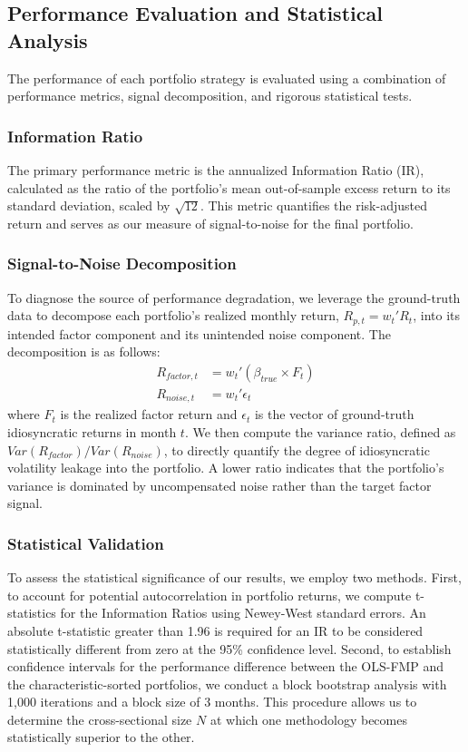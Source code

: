 \documentclass[]{article}
\begin{document}
\subsection{Performance Evaluation and Statistical Analysis}
The performance of each portfolio strategy is evaluated using a combination of performance metrics, signal decomposition, and rigorous statistical tests.

\subsubsection{Information Ratio}
The primary performance metric is the annualized Information Ratio (IR), calculated as the ratio of the portfolio's mean out-of-sample excess return to its standard deviation, scaled by $\sqrt{12}$. This metric quantifies the risk-adjusted return and serves as our measure of signal-to-noise for the final portfolio.

\subsubsection{Signal-to-Noise Decomposition}
To diagnose the source of performance degradation, we leverage the ground-truth data to decompose each portfolio's realized monthly return, $R_{p,t} = w_t' R_t$, into its intended factor component and its unintended noise component. The decomposition is as follows:
\begin{align}
R_{factor, t} &= w_t' (\beta_{true} \times F_t) \\
R_{noise, t} &= w_t' \epsilon_t
\end{align}
where $F_t$ is the realized factor return and $\epsilon_t$ is the vector of ground-truth idiosyncratic returns in month $t$. We then compute the variance ratio, defined as $Var(R_{factor}) / Var(R_{noise})$, to directly quantify the degree of idiosyncratic volatility leakage into the portfolio. A lower ratio indicates that the portfolio's variance is dominated by uncompensated noise rather than the target factor signal.

\subsubsection{Statistical Validation}
To assess the statistical significance of our results, we employ two methods. First, to account for potential autocorrelation in portfolio returns, we compute t-statistics for the Information Ratios using Newey-West standard errors. An absolute t-statistic greater than 1.96 is required for an IR to be considered statistically different from zero at the 95\% confidence level. Second, to establish confidence intervals for the performance difference between the OLS-FMP and the characteristic-sorted portfolios, we conduct a block bootstrap analysis with 1,000 iterations and a block size of 3 months. This procedure allows us to determine the cross-sectional size $N$ at which one methodology becomes statistically superior to the other.
\end{document}
